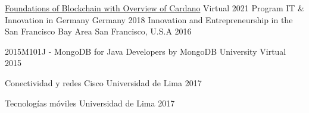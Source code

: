



\begin{cvhonors}

  \cvhonor
    {\href{https://www.credly.com/badges/95ade50f-c242-4928-9ebc-1e985a43d2aa}{Foundations of Blockchain with Overview of Cardano}} %
    {Virtual} %
    {2021} %
  \cvhonor
    {Program IT \& Innovation in Germany} %
    {Germany} %
    {2018} %
  \cvhonor
    {Innovation and Entrepreneurship in the San Francisco Bay Area} %
    {San Francisco, U.S.A} %
    {2016} %

  \cvhonor
    {2015M101J - MongoDB for Java Developers by MongoDB University}
    {Virtual}
    {2015}

\end{cvhonors}




\begin{cvhonors}

  \cvhonor
    {Conectividad y redes Cisco} %
    {Universidad de Lima} %
    {2017} %

  \cvhonor
    {Tecnologías móviles} %
    {Universidad de Lima} %
    {2017} %

\end{cvhonors}
